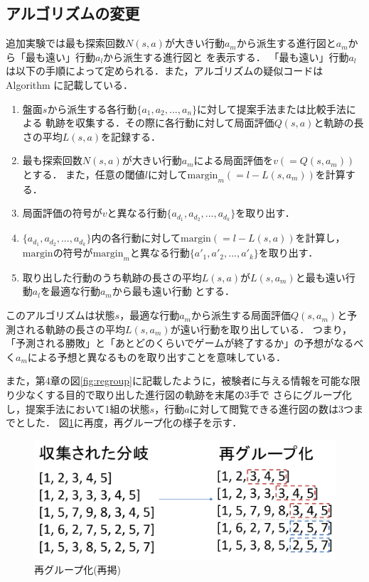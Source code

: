 \subsection{アルゴリズムの変更}
追加実験では最も探索回数$N(s, a)$が大きい行動$a_m$から派生する進行図と$a_m$から「最も遠い」行動$a_l$から派生する進行図と
を表示する．
「最も遠い」行動$a_l$は以下の手順によって定められる．また，アルゴリズムの疑似コードはAlgorithm\label{alg:myalg-add} に記載している．
\begin{enumerate}
    \item 盤面$s$から派生する各行動$\{a_1, a_2, ..., a_n\}$に対して提案手法または比較手法による
    軌跡を収集する．その際に各行動に対して局面評価$Q(s, a)$と軌跡の長さの平均$L(s, a)$を記録する．
    \item 最も探索回数$N(s, a)$が大きい行動$a_m$による局面評価を$v(=Q(s, a_m))$とする．
    また，任意の閾値$l$に対して$\textrm{margin}_m(=l-L(s, a_m))$を計算する．
    \item 局面評価の符号が$v$と異なる行動$\{a_{d_1}, a_{d_2}, ..., a_{d_k}\}$を取り出す．
    \item $\{a_{d_1}, a_{d_2}, ..., a_{d_k}\}$内の各行動に対して$\textrm{margin}(=l-L(s, a))$を計算し，
    $\textrm{margin}$の符号が$\textrm{margin}_m$と異なる行動$\{{a'}_{1}, {a'}_{2}, ..., {a'}_{k}\}$を取り出す．
    \item 取り出した行動のうち軌跡の長さの平均$L(s, a)$が$L(s, a_m)$と最も遠い行動$a_l$を最適な行動$a_m$から最も遠い行動
    とする．
\end{enumerate}
このアルゴリズムは状態$s$，最適な行動$a_m$から派生する局面評価$Q(s, a_m)$と予測される軌跡の長さの平均$L(s, a_m)$が遠い行動を取り出している．
つまり，「予測される勝敗」と「あとどのくらいでゲームが終了するか」の予想がなるべく$a_m$による予想と異なるものを取り出すことを意味している．

また，第4章の図\ref{fig:regroup}に記載したように，被験者に与える情報を可能な限り少なくする目的で取り出した進行図の軌跡を末尾の3手で
さらにグループ化し，提案手法において1組の状態$s$，行動$a$に対して閲覧できる進行図の数は3つまでとした．
図\ref{fig:re-regroup}に再度，再グループ化の様子を示す．
\begin{figure}[htbp]
	\centering
	\includegraphics[width=\linewidth]{./figure/regroup.pdf}
	\caption{再グループ化(再掲)}
	\label{fig:re-regroup}
\end{figure}

